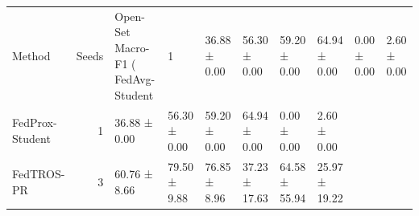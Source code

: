\begin{tabular}{lrllllll}
\toprule
Method & Seeds & Open-Set Macro-F1 (%
\midrule
FedAvg-Student & 1 & 36.88 ± 0.00 & 56.30 ± 0.00 & 59.20 ± 0.00 & 64.94 ± 0.00 & 0.00 ± 0.00 & 2.60 ± 0.00 \\
FedProx-Student & 1 & 36.88 ± 0.00 & 56.30 ± 0.00 & 59.20 ± 0.00 & 64.94 ± 0.00 & 0.00 ± 0.00 & 2.60 ± 0.00 \\
FedTROS-PR & 3 & 60.76 ± 8.66 & 79.50 ± 9.88 & 76.85 ± 8.96 & 37.23 ± 17.63 & 64.58 ± 55.94 & 25.97 ± 19.22 \\
\bottomrule
\end{tabular}
